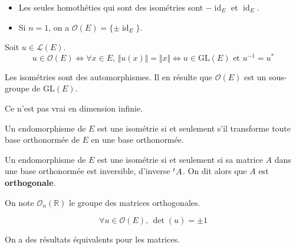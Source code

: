   \begin{example}
    \begin{itemize}
      \item Les seules homothéties qui sont des isométries sont $-\operatorname{id}_E$ et $\operatorname{id}_E$.
      \item Si $n = 1$, on a $\mathcal{O}(E) = \{ \pm \operatorname{id}_E \}$.
    \end{itemize}
  \end{example}


  \begin{proposition}
    Soit $u \in \mathcal{L}(E)$.
    \[ u \in \mathcal{O}(E) \iff \forall x \in E, \, \Vert u(x) \Vert = \Vert x \Vert \iff u \in \mathrm{GL}(E) \text{ et } u^{-1} = u^* \]
  \end{proposition}


  \begin{theorem}
    Les isométries sont des automorphismes. Il en résulte que $\mathcal{O}(E)$ est un sous-groupe de $\mathrm{GL}(E)$.
  \end{theorem}

  \begin{remark}
    Ce n'est pas vrai en dimension infinie.
  \end{remark}

  \begin{theorem}
    Un endomorphisme de $E$ est une isométrie si et seulement s'il transforme toute base orthonormée de $E$ en une base orthonormée.
  \end{theorem}

  \begin{theorem}
    Un endomorphisme de $E$ est une isométrie si et seulement si sa matrice $A$ dans une base orthonormée est inversible, d'inverse $\mathstrut ^t A$.
    \newpar
    On dit alors que $A$ est \textbf{orthogonale}.
  \end{theorem}

  \begin{notation}
    On note $\mathcal{O}_n(\mathbb{R})$ le groupe des matrices orthogonales.
  \end{notation}

  \begin{theorem}
    \[ \forall u \in \mathcal{O}(E), \, \det(u) = \pm 1 \]
  \end{theorem}

  \begin{remark}
    On a des résultats équivalents pour les matrices.
  \end{remark}

